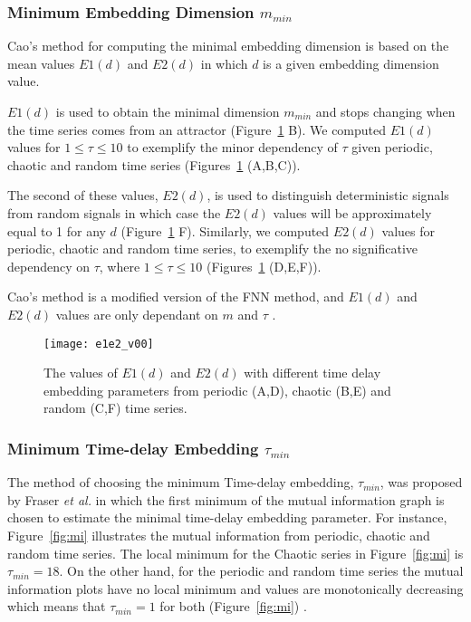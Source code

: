 \documentclass[10pt,journal,compsoc]{IEEEtran}
\begin{document}
\subsubsection{Minimum Embedding Dimension $m_{min}$}
Cao's method \cite{Cao1997} for computing the minimal embedding dimension is based on 
the mean values $E1(d)$ and $E2(d)$ in which $d$ is a given embedding dimension value.

$E1(d)$ is used to obtain the minimal dimension $m_{min}$ and stops changing 
when the time series comes from an attractor (Figure~\ref{fig:e1e2} B).
We computed $E1(d)$ values for $1 \leq \tau \leq 10$ to exemplify 
the minor dependency of $\tau$ given periodic, chaotic and random time series
(Figures~\ref{fig:e1e2} (A,B,C)).

The second of these values, $E2(d)$, is used to distinguish 
deterministic signals from random signals in which case the $E2(d)$ values will be approximately 
equal to 1 for any $d$ (Figure~\ref{fig:e1e2} F).
Similarly, we computed $E2(d)$ values for periodic, chaotic and random time series,
to exemplify the no significative dependency on $\tau$, where $1 \leq \tau \leq 10$ 
(Figures~\ref{fig:e1e2} (D,E,F)).

Cao's method is a modified version of the FNN method, and $E1(d)$ and 
$E2(d)$ values are only dependant on $m$ and $\tau$ \cite{Cao1997}.


\begin{figure}[!htb]
\centering    
 \texttt{[image: e1e2\_v00]}
\caption[PA]{The values of $E1(d)$ and $E2(d)$ with different time delay embedding parameters
from periodic (A,D), chaotic (B,E) and random (C,F) time series.}
\label{fig:e1e2}
\end{figure}


\subsubsection{Minimum Time-delay Embedding  $\tau_{min}$}
The method of choosing the minimum Time-delay embedding, $\tau_{min}$, was proposed 
by Fraser \emph{et al.} \cite{Fraser1986} in which the first minimum of the mutual 
information graph is chosen to estimate the minimal time-delay embedding parameter.
For instance, Figure~\ref{fig:mi}  illustrates 
the mutual information from periodic, chaotic and random time series.
The local minimum for the Chaotic series in Figure~\ref{fig:mi} is $\tau_{min} = 18$.
On the other hand, for the periodic and random time series 
the mutual information plots have no local minimum 
and values are monotonically decreasing which means that $\tau_{min} = 1$ for both
(Figure~\ref{fig:mi}) \cite{Fraser1986}.
\end{document}
